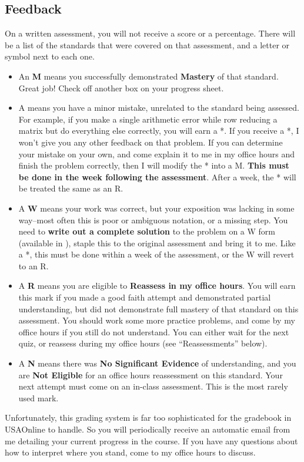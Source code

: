 \documentclass{article}
\begin{document}
    \subsection*{\fontsize{10}{12}\selectfont Feedback}
    On a written assessment, you will not receive a score or a percentage.  There will be a list of the standards that were covered on that assessment, and a letter or symbol next to each one.
    \begin{itemize}
    \item An {\bf M} means you successfully demonstrated {\bf Mastery} of that standard.  Great job!  Check off another box on your progress sheet.
    \item A {\bf *} means you have a minor mistake, unrelated to the standard being assessed.  For example, if you make a single arithmetic error while row reducing a matrix but do everything else correctly, you will earn a *.  If you receive a *, I won't give you any other feedback on that problem.  If you can determine your mistake on your own, and come explain it to me in my office hours and finish the problem correctly, then I will modify the * into a M.  {\bf This must be done in the week following the assessment}.  After a week, the * will be treated the same as an R.
        \item A {\bf W} means your work was correct, but your exposition was lacking in some way--most often this is poor or ambiguous notation, or a missing step.  You need to {\bf write out a complete solution} to the problem on a W form (available in \LMS), staple this to the original assessment and bring it to me.  Like a *, this must be done within a week of the assessment, or the W will revert to an R.
    \item A {\bf R} means you are eligible to {\bf Reassess in my office hours}.  You will earn this mark if you made a good faith attempt and demonstrated partial understanding, but did not demonstrate full mastery of that standard on this assessment.  You should work some more practice problems, and come by my office hours if you still do not understand.  You can either wait for the next quiz, or reassess during my office hours (see ``Reassessments'' below).

    \item A {\bf N} means there was {\bf No Significant Evidence} of understanding, and you are {\bf Not Eligible} for an office hours reassessment on this standard.  Your next attempt must come on an in-class assessment.  This is the most rarely used mark.

    \end{itemize}
    Unfortunately, this grading system is far too sophisticated for the gradebook in USAOnline to handle.  So you will periodically receive an automatic email from me detailing your current progress in the course.  If you have any questions about how to interpret where you stand, come to my office hours to discuss.
\end{document}

